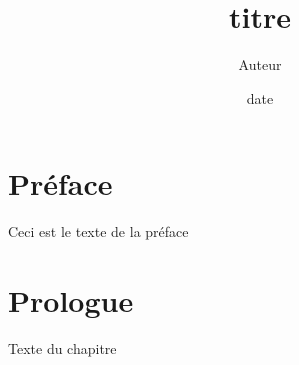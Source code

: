 \documentclass[a4paper, 11pt]{book}
\title{titre}
\author{Auteur}
\date{date}
\begin{document}
    \renewcommand{\contentsname}{Sommaire}  
    \renewcommand{\partname}{Livre}
    \setlength{\parindent}{4em}
    \setlength{\parskip}{1em}

    \begin{titlepage}
        \maketitle
    \end{titlepage}

    \frontmatter
    \chapter*{Préface}
        Ceci est le texte de la préface
    \chapter*{Prologue}
    \setlength{\epigraphwidth}{0.5\textwidth}
        Texte du chapitre
\end{document}
